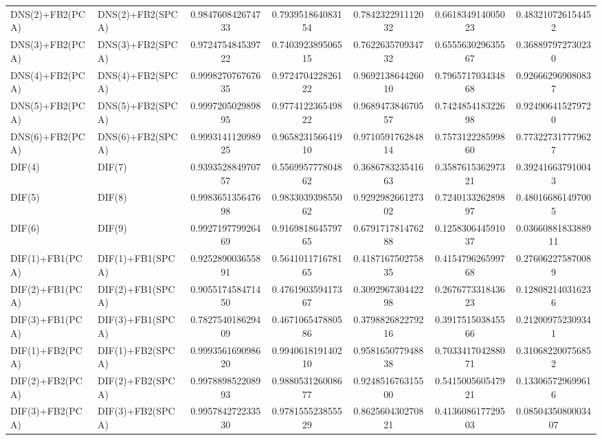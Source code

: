 \begin{table}[H]
\begin{tabular}{llSSSSS}
DNS(2)+FB2(PCA) & DNS(2)+FB2(SPCA) & 0.984760842674733 & 0.793951864083154 & 0.784232291112032 & 0.661834914005023 & 0.483210726154452 \\ 
DNS(3)+FB2(PCA) & DNS(3)+FB2(SPCA) & 0.972475484539722 & 0.740392389506515 & 0.762263570934732 & 0.655563029635567 & 0.368897972730230 \\ 
DNS(4)+FB2(PCA) & DNS(4)+FB2(SPCA) & 0.999827076767635 & 0.972470422826122 & 0.969213864426010 & 0.796571703434868 & 0.926662969080837 \\ 
DNS(5)+FB2(PCA) & DNS(5)+FB2(SPCA) & 0.999720502989895 & 0.977412236549822 & 0.968947384670557 & 0.742485418322698 & 0.924906415279720 \\ 
DNS(6)+FB2(PCA) & DNS(6)+FB2(SPCA) & 0.999314112098925 & 0.965823156641910 & 0.971059176284814 & 0.757312228599860 & 0.773227317779627 \\ 
DIF(4) & DIF(7) & 0.939352884970757 & 0.556995777804862 & 0.368678323541663 & 0.358761536297321 & 0.392416637910043 \\ 
DIF(5) & DIF(8) & 0.998365135647698 & 0.983303939855062 & 0.929298266127302 & 0.724013326289897 & 0.480166861497005 \\ 
DIF(6) & DIF(9) & 0.992719779926469 & 0.916981864579765 & 0.679171781476288 & 0.125830644591037 & 0.0366088183388911 \\ 
DIF(1)+FB1(PCA) & DIF(1)+FB1(SPCA) & 0.925289003655891 & 0.564101171678165 & 0.418716750275835 & 0.415479626599768 & 0.276062275870089 \\ 
DIF(2)+FB1(PCA) & DIF(2)+FB1(SPCA) & 0.905517458471450 & 0.476190359417367 & 0.309296730442298 & 0.267677331843623 & 0.128082140316236 \\ 
DIF(3)+FB1(PCA) & DIF(3)+FB1(SPCA) & 0.782754018629409 & 0.467106547880586 & 0.379882682279216 & 0.391751503845566 & 0.212009752309341 \\ 
DIF(1)+FB2(PCA) & DIF(1)+FB2(SPCA) & 0.999356169098620 & 0.994061819140210 & 0.958165077948838 & 0.703341704288071 & 0.310682200756852 \\ 
DIF(2)+FB2(PCA) & DIF(2)+FB2(SPCA) & 0.997889852208993 & 0.988053126008677 & 0.924851676315500 & 0.541500560547921 & 0.133065729699616 \\ 
DIF(3)+FB2(PCA) & DIF(3)+FB2(SPCA) & 0.995784272233530 & 0.978155523855529 & 0.862560430270821 & 0.413608617729503 & 0.0850435080003407 \\ \bottomrule 
\end{tabular}
\end{table}